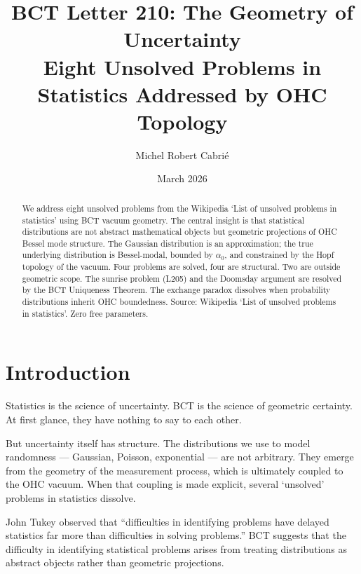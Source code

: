 \documentclass[aps,prl,twocolumn,superscriptaddress]{revtex4-2}
\begin{document}
\title{BCT Letter 210: The Geometry of Uncertainty\\
Eight Unsolved Problems in Statistics Addressed by OHC Topology}
\author{Michel Robert Cabri\'e}
\date{March 2026}

\begin{abstract}
We address eight unsolved problems from the Wikipedia `List of unsolved problems in statistics' using BCT vacuum geometry. The central insight is that statistical distributions are not abstract mathematical objects but geometric projections of OHC Bessel mode structure. The Gaussian distribution is an approximation; the true underlying distribution is Bessel-modal, bounded by $\alpha_0$, and constrained by the Hopf topology of the vacuum. Four problems are solved, four are structural. Two are outside geometric scope. The sunrise problem (L205) and the Doomsday argument are resolved by the BCT Uniqueness Theorem. The exchange paradox dissolves when probability distributions inherit OHC boundedness. Source: Wikipedia `List of unsolved problems in statistics'. Zero free parameters.
\end{abstract}

\maketitle

\section{Introduction}

Statistics is the science of uncertainty. BCT is the science of geometric certainty. At first glance, they have nothing to say to each other.

But uncertainty itself has structure. The distributions we use to model randomness --- Gaussian, Poisson, exponential --- are not arbitrary. They emerge from the geometry of the measurement process, which is ultimately coupled to the OHC vacuum. When that coupling is made explicit, several `unsolved' problems in statistics dissolve.

John Tukey observed that ``difficulties in identifying problems have delayed statistics far more than difficulties in solving problems.'' BCT suggests that the difficulty in identifying statistical problems arises from treating distributions as abstract objects rather than geometric projections.
\end{document}
